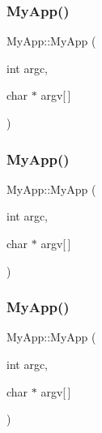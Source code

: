 \subsubsection{\texorpdfstring{My\+App()}{MyApp()}\hspace{0.1cm}{\footnotesize\ttfamily [2/8]}}
{\footnotesize\ttfamily My\+App\+::\+My\+App (\begin{DoxyParamCaption}\item[{int}]{argc,  }\item[{char $\ast$}]{argv\mbox{[}$\,$\mbox{]} }\end{DoxyParamCaption})\hspace{0.3cm}{\ttfamily [inline]}}

\mbox{\label{class_my_app_a2cedcf8942b99702d5e26db7d07ff57b}} 
\subsubsection{\texorpdfstring{My\+App()}{MyApp()}\hspace{0.1cm}{\footnotesize\ttfamily [3/8]}}
{\footnotesize\ttfamily My\+App\+::\+My\+App (\begin{DoxyParamCaption}\item[{int}]{argc,  }\item[{char $\ast$}]{argv\mbox{[}$\,$\mbox{]} }\end{DoxyParamCaption})\hspace{0.3cm}{\ttfamily [inline]}}

\mbox{\label{class_my_app_a2cedcf8942b99702d5e26db7d07ff57b}} 
\subsubsection{\texorpdfstring{My\+App()}{MyApp()}\hspace{0.1cm}{\footnotesize\ttfamily [4/8]}}
{\footnotesize\ttfamily My\+App\+::\+My\+App (\begin{DoxyParamCaption}\item[{int}]{argc,  }\item[{char $\ast$}]{argv\mbox{[}$\,$\mbox{]} }\end{DoxyParamCaption})\hspace{0.3cm}{\ttfamily [inline]}}

